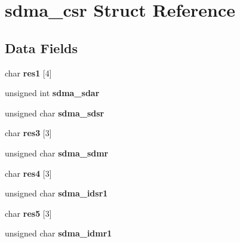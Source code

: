 \hypertarget{structsdma__csr}{}\section{sdma\+\_\+csr Struct Reference}
\label{structsdma__csr}
\subsection*{Data Fields}
\begin{DoxyCompactItemize}
\item 
\mbox{\label{structsdma__csr_af32722ca0fcf8298b97e95f9494a5db3}} 
char {\bfseries res1} \mbox{[}4\mbox{]}
\item 
\mbox{\label{structsdma__csr_a93d08dbe98f72defde5d42689e6cc1f2}} 
unsigned int {\bfseries sdma\+\_\+sdar}
\item 
\mbox{\label{structsdma__csr_ae65a417c7cd57207fc0eec21c0428520}} 
unsigned char {\bfseries sdma\+\_\+sdsr}
\item 
\mbox{\label{structsdma__csr_ace73059fc6c09970569fa7a217b96d57}} 
char {\bfseries res3} \mbox{[}3\mbox{]}
\item 
\mbox{\label{structsdma__csr_a484e0c3b8008efd36d8b99e137e03af1}} 
unsigned char {\bfseries sdma\+\_\+sdmr}
\item 
\mbox{\label{structsdma__csr_ac8a4830ddba77e8e251dfb8e124a0853}} 
char {\bfseries res4} \mbox{[}3\mbox{]}
\item 
\mbox{\label{structsdma__csr_ad4cdaee1c30cc2f03e2cb389d759b242}} 
unsigned char {\bfseries sdma\+\_\+idsr1}
\item 
\mbox{\label{structsdma__csr_ab371cb2aa6ba4c3d8b368f313245fed5}} 
char {\bfseries res5} \mbox{[}3\mbox{]}
\item 
\mbox{\label{structsdma__csr_a809f4194ef5247c6a8cabf90bbf77b66}} 
unsigned char {\bfseries sdma\+\_\+idmr1}
\item 
\mbox{\label{structsdma__csr_a8099d4acea57652802a0276088ef72a0}} 

\end{DoxyCompactItemize}
